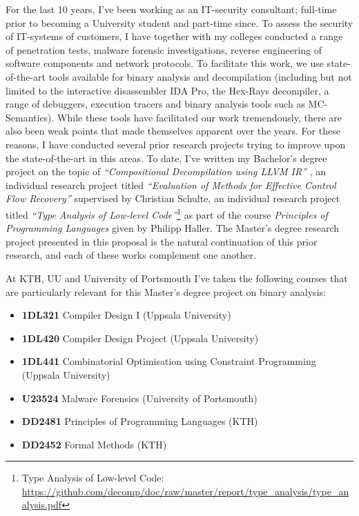 \documentclass[12pt, a4paper]{article}
\begin{document}
For the last 10 years, I've been working as an IT-security consultant; full-time prior to becoming a University student and part-time since. To assess the security of IT-systems of customers, I have together with my colleges conducted a range of penetration tests, malware forensic investigations, reverse engineering of software components and network protocols. To facilitate this work, we use state-of-the-art tools available for binary analysis and decompilation (including but not limited to the interactive disassembler IDA Pro, the Hex-Rays decompiler, a range of debuggers, execution tracers and binary analysis tools such as MC-Semantics). While these tools have facilitated our work tremendously, there are also been weak points that made themselves apparent over the years. For these reasons, I have conducted several prior research projects trying to improve upon the state-of-the-art in this areas. To date, I've written my Bachelor's degree project on the topic of \textit{``Compositional Decompilation using LLVM IR''} \cite{compositional_decompilation}, an individual research project titled \textit{``Evaluation of Methods for Effective Control Flow Recovery''} supervised by Christian Schulte, an individual research project titled \textit{``Type Analysis of Low-level Code''}\footnote{Type Analysis of Low-level Code: \url{https://github.com/decomp/doc/raw/master/report/type_analysis/type_analysis.pdf}} as part of the course \textit{Principles of Programming Languages} given by Philipp Haller. The Master's degree research project presented in this proposal is the natural continuation of this prior research, and each of these works complement one another.

At KTH, UU and University of Portsmouth I've taken the following courses that are particularly relevant for this Master's degree project on binary analysis:

\begin{itemize}
	\item \textbf{1DL321} Compiler Design I (Uppsala University)
	\item \textbf{1DL420} Compiler Design Project (Uppsala University)
	\item \textbf{1DL441} Combinatorial Optimisation using Constraint Programming (Uppsala University)
	\item \textbf{U23524} Malware Forensics (University of Portsmouth)
	\item \textbf{DD2481} Principles of Programming Languages (KTH)
	\item \textbf{DD2452} Formal Methods (KTH)
\end{itemize}
\end{document}
